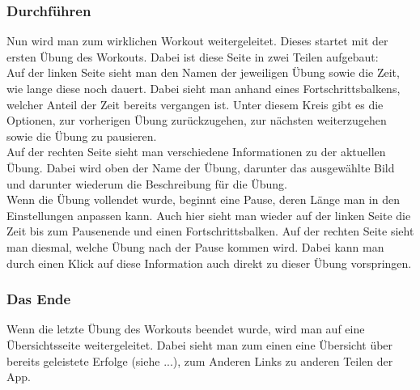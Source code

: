 \documentclass[
	fontsize=11pt,
	]{article}
\begin{document}
\subsubsection{Durchführen}
Nun wird man zum wirklichen Workout weitergeleitet. Dieses startet mit der ersten Übung des Workouts. Dabei ist diese Seite in zwei Teilen aufgebaut:\\
Auf der linken Seite sieht man den Namen der jeweiligen Übung sowie die Zeit, wie lange diese noch dauert. Dabei sieht man anhand eines Fortschrittsbalkens, welcher Anteil der Zeit bereits vergangen ist. Unter diesem Kreis gibt es die Optionen, zur vorherigen Übung zurückzugehen, zur nächsten weiterzugehen sowie die Übung zu pausieren.\\
Auf der rechten Seite sieht man verschiedene Informationen zu der aktuellen Übung. Dabei wird oben der Name der Übung, darunter das ausgewählte Bild und darunter wiederum die Beschreibung für die Übung.\\
Wenn die Übung vollendet wurde, beginnt eine Pause, deren Länge man in den Einstellungen anpassen kann. Auch hier sieht man wieder auf der linken Seite die Zeit bis zum Pausenende und einen Fortschrittsbalken. Auf der rechten Seite sieht man diesmal, welche Übung nach der Pause kommen wird. Dabei kann man durch einen Klick auf diese Information auch direkt zu dieser Übung vorspringen.
\subsubsection{Das Ende}
Wenn die letzte Übung des Workouts beendet wurde, wird man auf eine Übersichtsseite weitergeleitet. Dabei sieht man zum einen eine Übersicht über bereits geleistete Erfolge (siehe ...), zum Anderen Links zu anderen Teilen der App.
\end{document}
